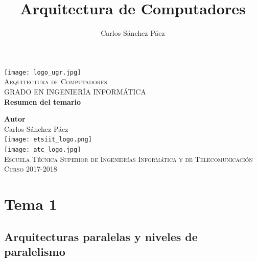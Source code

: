 \documentclass[12pt,spanish]{article}
\title{Arquitectura de Computadores}
\author{Carlos Sánchez Páez}
\begin{document}
\begin{titlepage}

\newlength{\centeroffset}
\setlength{\centeroffset}{-0.5\oddsidemargin}
\addtolength{\centeroffset}{0.5\evensidemargin}
\thispagestyle{empty}

\noindent\hspace*{\centeroffset}
\begin{minipage}{\textwidth}

\centering
\texttt{[image: logo\_ugr.jpg]}\\[1.4cm]

\textsc{ \Large Arquitectura de Computadores\\[0.2cm]}
\textsc{GRADO EN INGENIERÍA INFORMÁTICA}\\[1cm]

{\Huge\bfseries Resumen del temario\\}
\end{minipage}

\vspace{1.5cm}
\noindent\hspace*{\centeroffset}
\begin{minipage}{\textwidth}
\centering

\textbf{Autor}\\ {Carlos Sánchez Páez}\\[2.5ex]
\texttt{[image: etsiit\_logo.png]}\\[0.1cm]
\vspace{1.5cm}
\texttt{[image: atc\_logo.jpg]}\\[0.1cm]
\vspace{1cm}
\textsc{Escuela Técnica Superior de Ingenierías Informática y de Telecomunicación}\\
\vspace{1cm}
\textsc{Curso 2017-2018}
\end{minipage}
\end{titlepage}
\thispagestyle{empty}
\newpage
\tableofcontents{}
\listoflistings
\listoffigures
\thispagestyle{empty}
\newpage

\section{Tema 1}

\subsection{Arquitecturas paralelas y niveles de paralelismo}
\end{document}
